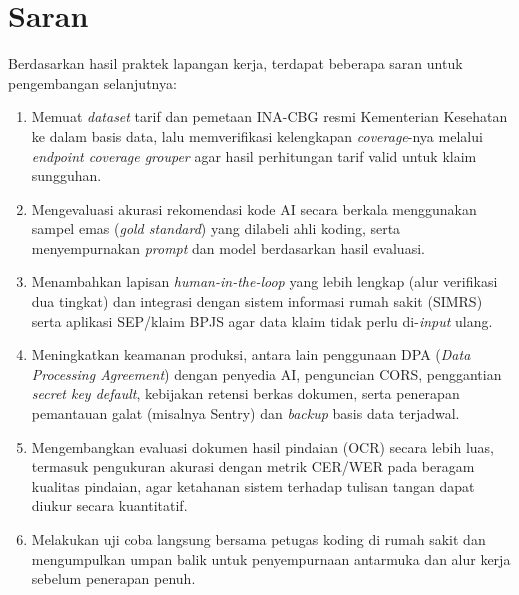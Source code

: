 \section{Saran}
Berdasarkan hasil praktek lapangan kerja, terdapat beberapa saran untuk pengembangan selanjutnya:
\begin{enumerate}
  \item Memuat \textit{dataset} tarif dan pemetaan INA-CBG resmi Kementerian Kesehatan ke dalam basis data, lalu memverifikasi kelengkapan \textit{coverage}-nya melalui \textit{endpoint coverage grouper} agar hasil perhitungan tarif valid untuk klaim sungguhan.
  \item Mengevaluasi akurasi rekomendasi kode AI secara berkala menggunakan sampel emas (\textit{gold standard}) yang dilabeli ahli koding, serta menyempurnakan \textit{prompt} dan model berdasarkan hasil evaluasi.
  \item Menambahkan lapisan \textit{human-in-the-loop} yang lebih lengkap (alur verifikasi dua tingkat) dan integrasi dengan sistem informasi rumah sakit (SIMRS) serta aplikasi SEP/klaim BPJS agar data klaim tidak perlu di-\textit{input} ulang.
  \item Meningkatkan keamanan produksi, antara lain penggunaan DPA (\textit{Data Processing Agreement}) dengan penyedia AI, penguncian CORS, penggantian \textit{secret key default}, kebijakan retensi berkas dokumen, serta penerapan pemantauan galat (misalnya Sentry) dan \textit{backup} basis data terjadwal.
  \item Mengembangkan evaluasi dokumen hasil pindaian (OCR) secara lebih luas, termasuk pengukuran akurasi dengan metrik CER/WER pada beragam kualitas pindaian, agar ketahanan sistem terhadap tulisan tangan dapat diukur secara kuantitatif.
  \item Melakukan uji coba langsung bersama petugas koding di rumah sakit dan mengumpulkan umpan balik untuk penyempurnaan antarmuka dan alur kerja sebelum penerapan penuh.
\end{enumerate}
